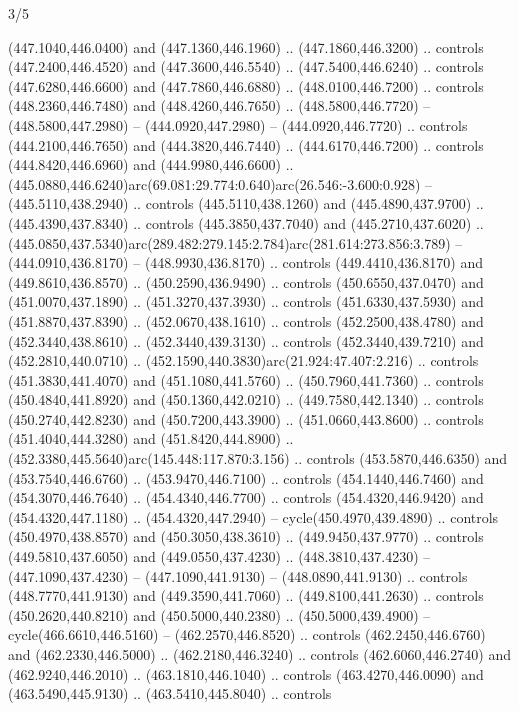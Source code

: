 \begin{flagdescription}{3/5}
\begin{scope}[shift={(0.5\flaglength,0.5\flagwidth)},scale=\flagwidth/510]
\begin{scope}[y=0.80pt, x=0.80pt, yscale=-1.06, xscale=1.06,yshift=-240pt,xshift=-400pt]
\begin{scope}[cm={{0.83333,0.0,0.0,0.83333,(154.64672,48.64761)}}]
\begin{scope}[cm={{0.93334,0.0,0.0,0.93334,(-4.86471,22.64035)}}]
\begin{scope}[draw=black]
  (447.1040,446.0400) and (447.1360,446.1960) .. (447.1860,446.3200) .. controls
  (447.2400,446.4520) and (447.3600,446.5540) .. (447.5400,446.6240) .. controls
  (447.6280,446.6600) and (447.7860,446.6880) .. (448.0100,446.7200) .. controls
  (448.2360,446.7480) and (448.4260,446.7650) .. (448.5800,446.7720) --
  (448.5800,447.2980) -- (444.0920,447.2980) -- (444.0920,446.7720) .. controls
  (444.2100,446.7650) and (444.3820,446.7440) .. (444.6170,446.7200) .. controls
  (444.8420,446.6960) and (444.9980,446.6600) ..
  (445.0880,446.6240)arc(69.081:29.774:0.640)arc(26.546:-3.600:0.928) --
  (445.5110,438.2940) .. controls (445.5110,438.1260) and (445.4890,437.9700) ..
  (445.4390,437.8340) .. controls (445.3850,437.7040) and (445.2710,437.6020) ..
  (445.0850,437.5340)arc(289.482:279.145:2.784)arc(281.614:273.856:3.789) --
  (444.0910,436.8170) -- (448.9930,436.8170) .. controls (449.4410,436.8170) and
  (449.8610,436.8570) .. (450.2590,436.9490) .. controls (450.6550,437.0470) and
  (451.0070,437.1890) .. (451.3270,437.3930) .. controls (451.6330,437.5930) and
  (451.8870,437.8390) .. (452.0670,438.1610) .. controls (452.2500,438.4780) and
  (452.3440,438.8610) .. (452.3440,439.3130) .. controls (452.3440,439.7210) and
  (452.2810,440.0710) .. (452.1590,440.3830)arc(21.924:47.407:2.216) .. controls
  (451.3830,441.4070) and (451.1080,441.5760) .. (450.7960,441.7360) .. controls
  (450.4840,441.8920) and (450.1360,442.0210) .. (449.7580,442.1340) .. controls
  (450.2740,442.8230) and (450.7200,443.3900) .. (451.0660,443.8600) .. controls
  (451.4040,444.3280) and (451.8420,444.8900) ..
  (452.3380,445.5640)arc(145.448:117.870:3.156) .. controls (453.5870,446.6350)
  and (453.7540,446.6760) .. (453.9470,446.7100) .. controls (454.1440,446.7460)
  and (454.3070,446.7640) .. (454.4340,446.7700) .. controls (454.4320,446.9420)
  and (454.4320,447.1180) .. (454.4320,447.2940) -- cycle(450.4970,439.4890) ..
  controls (450.4970,438.8570) and (450.3050,438.3610) .. (449.9450,437.9770) ..
  controls (449.5810,437.6050) and (449.0550,437.4230) .. (448.3810,437.4230) --
  (447.1090,437.4230) -- (447.1090,441.9130) -- (448.0890,441.9130) .. controls
  (448.7770,441.9130) and (449.3590,441.7060) .. (449.8100,441.2630) .. controls
  (450.2620,440.8210) and (450.5000,440.2380) .. (450.5000,439.4900) --
  cycle(466.6610,446.5160) -- (462.2570,446.8520) .. controls
  (462.2450,446.6760) and (462.2330,446.5000) .. (462.2180,446.3240) .. controls
  (462.6060,446.2740) and (462.9240,446.2010) .. (463.1810,446.1040) .. controls
  (463.4270,446.0090) and (463.5490,445.9130) .. (463.5410,445.8040) .. controls

\end{scope}
\end{scope}
\end{scope}
\end{scope}
\end{scope}
\end{flagdescription}
